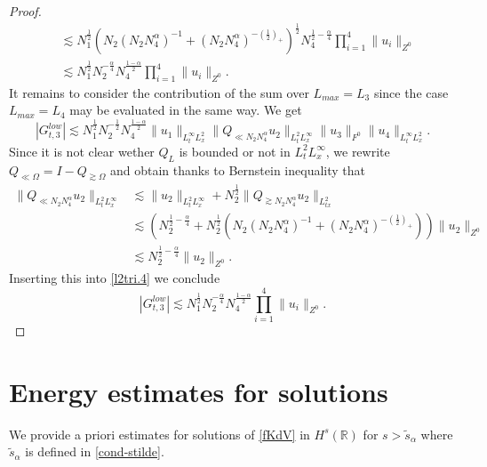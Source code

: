 \documentclass{amsart}
\theoremstyle{definition}
\theoremstyle{remark}
\def\R{{\mathbb R}}
\numberwithin{equation}{section}
\begin{document}
\begin{proof}
\begin{align*}
    &\lesssim N_1^{\frac 12} (N_2(N_2N_4^\alpha)^{-1} + (N_2N_4^\alpha)^{-(\frac 12)_+})^{\frac 12} N_4^{\frac 12-\frac \alpha 4} \prod_{i=1}^4 \|u_i\|_{Z^0}\\
    & \lesssim N_1^{\frac 12}N_2^{-\frac \alpha 4} N_4^{\frac{1-\alpha}2} \prod_{i=1}^4 \|u_i\|_{Z^0}.
  \end{align*}
  It remains to consider the contribution of the sum over $L_{max}=L_3$ since the case $L_{max}=L_4$ may be evaluated in the same way. We get 
  \begin{equation}\label{l2tri.4}
  |G_{t,3}^{low}| \lesssim N_1^{\frac 12} N_2^{-\frac 12} N_4^{\frac {1-\alpha}2} \|u_1\|_{L^\infty_tL^2_x} \|Q_{\ll N_2N_4^\alpha}u_2\|_{L^2_tL^\infty_x} \|u_3\|_{F^0} \|u_4\|_{L^\infty_tL^2_x}.
  \end{equation}
  Since it is not clear wether $Q_L$ is bounded or not in $L^2_tL^\infty_x$, we rewrite $Q_{\ll\Omega} = I - Q_{\gtrsim \Omega}$ and obtain thanks to Bernstein inequality that
  \begin{align*}
    \|Q_{\ll N_2N_4^\alpha}u_2\|_{L^2_tL^\infty_x} &\lesssim \|u_2\|_{L^2_tL^\infty_x} + N_2^{\frac 12} \|Q_{\gtrsim N_2N_4^\alpha}u_2\|_{L^2_{tx}} \\
    &\lesssim \left(N_2^{\frac 12-\frac \alpha 4} + N_2^{\frac 12}(N_2(N_2N_4^\alpha)^{-1}+(N_2N_4^\alpha)^{-(\frac 12)_+})\right ) \|u_2\|_{Z^0}\\
    &\lesssim N_2^{\frac 12-\frac \alpha 4} \|u_2\|_{Z^0}.
  \end{align*}
  Inserting this into \eqref{l2tri.4} we conclude
  $$
  |G_{t,3}^{low}| \lesssim N_1^{\frac 12}N_2^{-\frac \alpha 4} N_4^{\frac{1-\alpha}2} \prod_{i=1}^4 \|u_i\|_{Z^0}.
  $$
  
\end{proof}



\section{Energy estimates for solutions} \label{Sec:4}
We provide a priori estimates for solutions of \eqref{fKdV} in $H^s(\R)$ for $s>\widetilde{s}_\alpha$ where $\widetilde{s}_\alpha$ is defined in \eqref{cond-stilde}.
\end{document}
